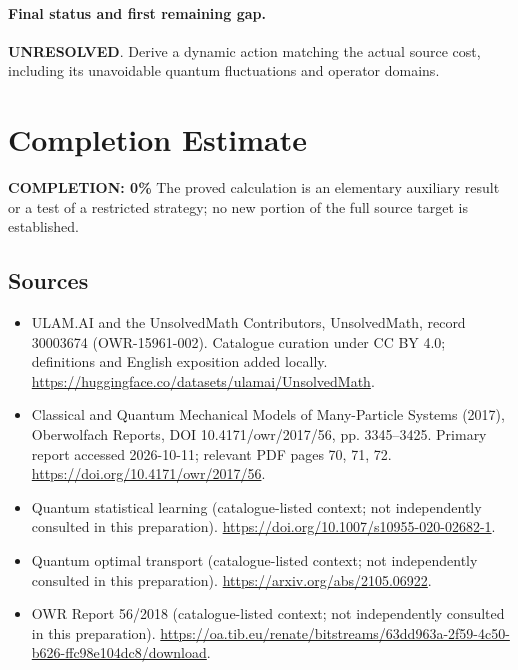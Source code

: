 \documentclass[11pt]{article}
\begin{document}
\paragraph{Final status and first remaining gap.}
\textbf{UNRESOLVED}. Derive a dynamic action matching the actual source cost, including its unavoidable quantum fluctuations and operator domains.

\section{Completion Estimate}
\noindent\textbf{COMPLETION: 0\%}
The proved calculation is an elementary auxiliary result or a test of a restricted strategy; no new portion of the full source target is established.

\subsection{Sources}
\begin{itemize}
\item[\hypertarget{source:30003674:1}{S1}] ULAM.AI and the UnsolvedMath Contributors, UnsolvedMath, record 30003674 (OWR-15961-002). Catalogue curation under CC BY 4.0; definitions and English exposition added locally.
\url{https://huggingface.co/datasets/ulamai/UnsolvedMath}.
\item[\hypertarget{source:30003674:2}{S2}] Classical and Quantum Mechanical Models of Many-Particle Systems (2017), Oberwolfach Reports, DOI 10.4171/owr/2017/56, pp. 3345--3425. Primary report accessed 2026-10-11; relevant PDF pages 70, 71, 72.
\url{https://doi.org/10.4171/owr/2017/56}.
\item[\hypertarget{source:30003674:3}{S3}] Quantum statistical learning (catalogue-listed context; not independently consulted in this preparation).
\url{https://doi.org/10.1007/s10955-020-02682-1}.
\item[\hypertarget{source:30003674:4}{S4}] Quantum optimal transport (catalogue-listed context; not independently consulted in this preparation).
\url{https://arxiv.org/abs/2105.06922}.
\item[\hypertarget{source:30003674:5}{S5}] OWR Report 56/2018 (catalogue-listed context; not independently consulted in this preparation).
\url{https://oa.tib.eu/renate/bitstreams/63dd963a-2f59-4c50-b626-ffc98e104dc8/download}.
\end{itemize}
\label{end:30003674}
\end{document}
